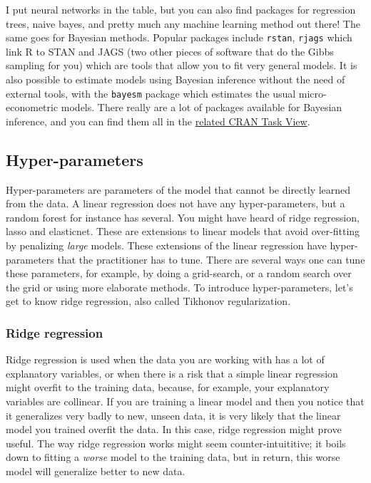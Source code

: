 \documentclass[]{gitbook}
\theoremstyle{definition}
\theoremstyle{definition}
\theoremstyle{definition}
\theoremstyle{remark}
\begin{document}
I put neural networks in the table, but you can also find packages for
regression trees, naive bayes, and pretty much any machine learning
method out there! The same goes for Bayesian methods. Popular packages
include \texttt{rstan}, \texttt{rjags} which link R to STAN and JAGS
(two other pieces of software that do the Gibbs sampling for you) which
are tools that allow you to fit very general models. It is also possible
to estimate models using Bayesian inference without the need of external
tools, with the \texttt{bayesm} package which estimates the usual
micro-econometric models. There really are a lot of packages available
for Bayesian inference, and you can find them all in the
\href{https://cran.r-project.org/web/views/Bayesian.html}{related CRAN
Task View}.

\hypertarget{hyper-parameters}{%
\subsection{Hyper-parameters}\label{hyper-parameters}}

Hyper-parameters are parameters of the model that cannot be directly
learned from the data. A linear regression does not have any
hyper-parameters, but a random forest for instance has several. You
might have heard of ridge regression, lasso and elasticnet. These are
extensions to linear models that avoid over-fitting by penalizing
\emph{large} models. These extensions of the linear regression have
hyper-parameters that the practitioner has to tune. There are several
ways one can tune these parameters, for example, by doing a grid-search,
or a random search over the grid or using more elaborate methods. To
introduce hyper-parameters, let's get to know ridge regression, also
called Tikhonov regularization.

\hypertarget{ridge-regression}{%
\subsubsection{Ridge regression}\label{ridge-regression}}

Ridge regression is used when the data you are working with has a lot of
explanatory variables, or when there is a risk that a simple linear
regression might overfit to the training data, because, for example,
your explanatory variables are collinear. If you are training a linear
model and then you notice that it generalizes very badly to new, unseen
data, it is very likely that the linear model you trained overfit the
data. In this case, ridge regression might prove useful. The way ridge
regression works might seem counter-intuititive; it boils down to
fitting a \emph{worse} model to the training data, but in return, this
worse model will generalize better to new data.
\end{document}
